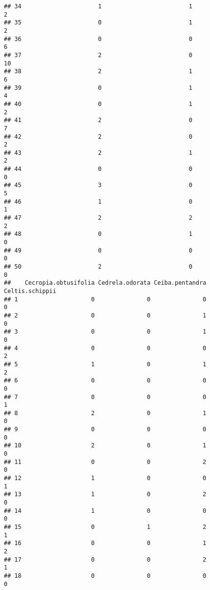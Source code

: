 \documentclass[
]{article}
\begin{document}
\begin{verbatim}
## 34                      1                         1                 2
## 35                      0                         1                 2
## 36                      0                         0                 6
## 37                      2                         0                10
## 38                      2                         1                 6
## 39                      0                         1                 4
## 40                      0                         1                 2
## 41                      2                         0                 7
## 42                      2                         0                 2
## 43                      2                         1                 2
## 44                      0                         0                 0
## 45                      3                         0                 5
## 46                      1                         0                 1
## 47                      2                         2                 2
## 48                      0                         1                 0
## 49                      0                         0                 0
## 50                      2                         0                 0
##    Cecropia.obtusifolia Cedrela.odorata Ceiba.pentandra Celtis.schippii
## 1                     0               0               0               0
## 2                     0               0               1               0
## 3                     0               0               1               0
## 4                     0               0               0               2
## 5                     1               0               1               2
## 6                     0               0               0               0
## 7                     0               0               0               1
## 8                     2               0               1               0
## 9                     0               0               0               0
## 10                    2               0               1               0
## 11                    0               0               2               0
## 12                    1               0               0               1
## 13                    1               0               2               0
## 14                    1               0               0               0
## 15                    0               1               2               1
## 16                    0               0               1               2
## 17                    0               0               2               1
## 18                    0               0               0               0

\end{verbatim}
\end{document}
